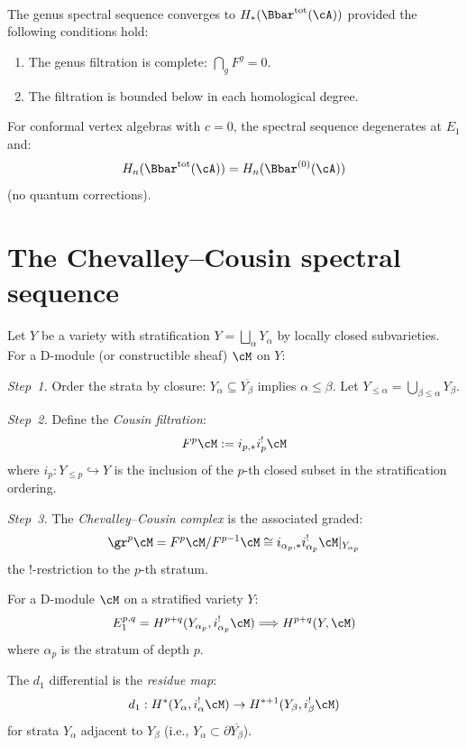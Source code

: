 \begin{theorem}
\label{thm:genus-ss-convergence}
\leavevmode\\
The genus spectral sequence converges to $H_*(\Bbar^{\mathrm{tot}}(\cA))$
provided the following conditions hold:
\begin{enumerate}[label=(\roman*)]
\item The genus filtration is complete: $\bigcap_g F^g = 0$.
\item The filtration is bounded below in each homological degree.
\end{enumerate}
For conformal vertex algebras with $c = 0$, the spectral sequence degenerates
at $E_1$ and:
\[
H_n(\Bbar^{\mathrm{tot}}(\cA)) = H_n(\Bbar^{(0)}(\cA))
\]
(no quantum corrections).
\end{theorem}


\section{The Chevalley--Cousin spectral sequence}
\label{sec:chevalley-cousin}


\begin{construction}
\label{constr:chevalley-cousin}
Let $Y$ be a variety with stratification $Y = \bigsqcup_\alpha Y_\alpha$ by
locally closed subvarieties. For a D-module (or constructible sheaf) $\cM$ on $Y$:

\emph{Step~1.} Order the strata by closure: $Y_\alpha \subseteq \overline{Y_\beta}$
implies $\alpha \leq \beta$. Let $Y_{\leq \alpha} = \bigcup_{\beta \leq \alpha} Y_\beta$.

\emph{Step~2.} Define the \emph{Cousin filtration}:
\[
F^p \cM := i_{p,*} i_p^! \cM
\]
where $i_p: Y_{\leq p} \hookrightarrow Y$ is the inclusion of the $p$-th closed
subset in the stratification ordering.

\emph{Step~3.} The \emph{Chevalley--Cousin complex} is the associated graded:
\[
\gr^p \cM = F^p \cM / F^{p-1} \cM \cong i_{\alpha_p,*} i_{\alpha_p}^! \cM|_{Y_{\alpha_p}}
\]
the $!$-restriction to the $p$-th stratum.
\end{construction}

\begin{theorem}
\label{thm:chevalley-cousin-ss}
For a D-module $\cM$ on a stratified variety $Y$:
\[
E_1^{p,q} = H^{p+q}(Y_{\alpha_p}, i_{\alpha_p}^! \cM) \Longrightarrow H^{p+q}(Y, \cM)
\]
where $\alpha_p$ is the stratum of depth $p$.

The $d_1$ differential is the \emph{residue map}:
\[
d_1: H^*(Y_\alpha, i_\alpha^! \cM) \to H^{*+1}(Y_{\beta}, i_\beta^! \cM)
\]
for strata $Y_\alpha$ adjacent to $Y_\beta$ (i.e., $Y_\alpha \subset \partial \overline{Y_\beta}$).
\end{theorem}

